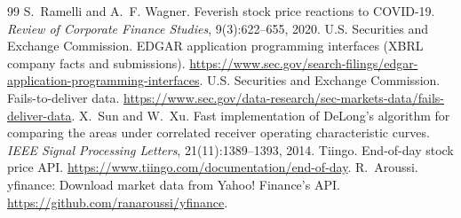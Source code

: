 \documentclass[11pt]{article}
\begin{document}
\begin{thebibliography}{99}
 S.~Ramelli and A.~F. Wagner. Feverish stock price reactions to COVID-19. \emph{Review of Corporate Finance Studies}, 9(3):622--655, 2020.
 U.S. Securities and Exchange Commission. EDGAR application programming interfaces (XBRL company facts and submissions). \url{https://www.sec.gov/search-filings/edgar-application-programming-interfaces}.
 U.S. Securities and Exchange Commission. Fails-to-deliver data. \url{https://www.sec.gov/data-research/sec-markets-data/fails-deliver-data}.
 X.~Sun and W.~Xu. Fast implementation of DeLong's algorithm for comparing the areas under correlated receiver operating characteristic curves. \emph{IEEE Signal Processing Letters}, 21(11):1389--1393, 2014.
 Tiingo. End-of-day stock price API. \url{https://www.tiingo.com/documentation/end-of-day}.
 R.~Aroussi. yfinance: Download market data from Yahoo! Finance's API. \url{https://github.com/ranaroussi/yfinance}.
\end{thebibliography}
\end{document}
